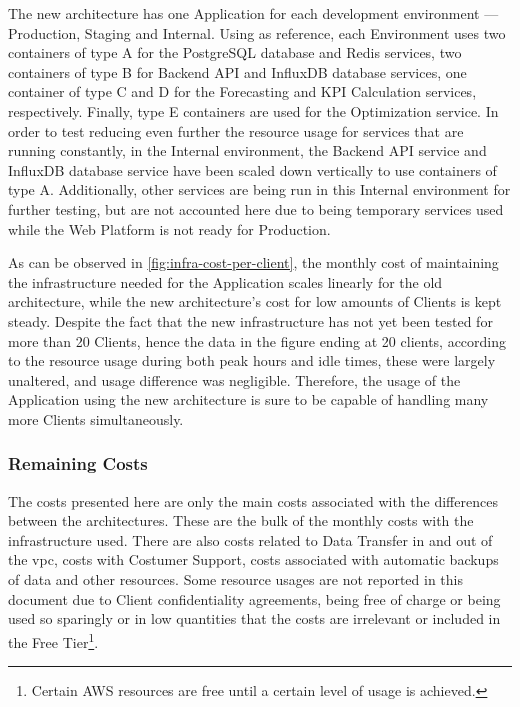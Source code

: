 The new architecture has one Application for each development environment --- Production, Staging and Internal. Using  as reference, each Environment uses two containers of type A for the PostgreSQL database and Redis services, two containers of type B for Backend API and InfluxDB database services, one container of type C and D for the Forecasting and KPI Calculation services, respectively. Finally, type E containers are used for the Optimization service. In order to test reducing even further the resource usage for services that are running constantly, in the Internal environment, the Backend API service and InfluxDB database service have been scaled down vertically to use containers of type A. Additionally, other services are being run in this Internal environment for further testing, but are not accounted here due to being temporary services used while the Web Platform is not ready for Production.



As can be observed in \cref{fig:infra-cost-per-client}, the monthly cost of maintaining the infrastructure needed for the Application scales linearly for the old architecture, while the new architecture's cost for low amounts of Clients is kept steady. Despite the fact that the new infrastructure has not yet been tested for more than 20 Clients, hence the data in the figure ending at 20 clients, according to the resource usage during both peak hours and idle times, these were largely unaltered, and usage difference was negligible. Therefore, the usage of the Application using the new architecture is sure to be capable of handling many more Clients simultaneously.


\subsubsection{Remaining Costs}\label{results-and-discussion:sss:remaining-costs}

The costs presented here are only the main costs associated with the differences between the architectures. These are the bulk of the monthly costs with the infrastructure used.
There are also costs related to Data Transfer in and out of the \gls{vpc}, costs with Costumer Support, costs associated with automatic backups of data and other resources. Some resource usages are not reported in this document due to Client confidentiality agreements, being free of charge or being used so sparingly or in low quantities that the costs are irrelevant or included in the Free Tier\footnote{Certain AWS resources are free until a certain level of usage is achieved.}.

